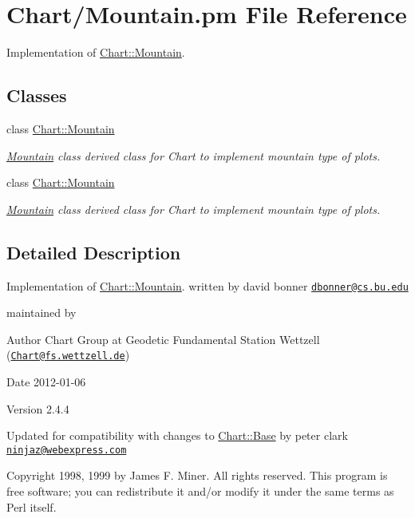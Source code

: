\hypertarget{Mountain_8pm}{
\section{Chart/Mountain.pm File Reference}
\label{Mountain_8pm}
}


Implementation of \hyperlink{classChart_1_1Mountain}{Chart::Mountain}.  


\subsection*{Classes}
\begin{DoxyCompactItemize}
\item 
class \hyperlink{classChart_1_1Mountain}{Chart::Mountain}
\begin{DoxyCompactList}\small\item\em \hyperlink{classChart_1_1Mountain}{Mountain} class derived class for Chart to implement mountain type of plots. \item\end{DoxyCompactList}\item 
class \hyperlink{classChart_1_1Mountain}{Chart::Mountain}
\begin{DoxyCompactList}\small\item\em \hyperlink{classChart_1_1Mountain}{Mountain} class derived class for Chart to implement mountain type of plots. \item\end{DoxyCompactList}\end{DoxyCompactItemize}


\subsection{Detailed Description}
Implementation of \hyperlink{classChart_1_1Mountain}{Chart::Mountain}. written by david bonner \href{mailto:dbonner@cs.bu.edu}{\tt dbonner@cs.bu.edu}

maintained by \begin{DoxyAuthor}{Author}
Chart Group at Geodetic Fundamental Station Wettzell (\href{mailto:Chart@fs.wettzell.de}{\tt Chart@fs.wettzell.de}) 
\end{DoxyAuthor}
\begin{DoxyDate}{Date}
2012-\/01-\/06 
\end{DoxyDate}
\begin{DoxyVersion}{Version}
2.4.4
\end{DoxyVersion}
Updated for compatibility with changes to \hyperlink{classChart_1_1Base}{Chart::Base} by peter clark \href{mailto:ninjaz@webexpress.com}{\tt ninjaz@webexpress.com}

Copyright 1998, 1999 by James F. Miner. All rights reserved. This program is free software; you can redistribute it and/or modify it under the same terms as Perl itself. 